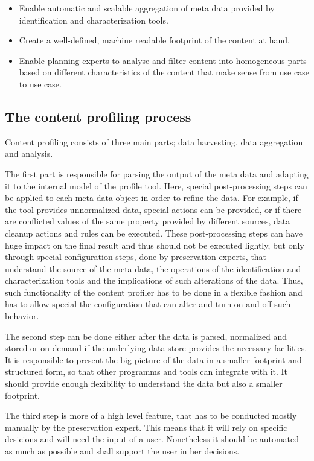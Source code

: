 \begin{itemize}
\item Enable automatic and scalable aggregation of meta data provided by identification and characterization tools.
\item Create a well-defined, machine readable footprint of the content at hand.
\item Enable planning experts to analyse and filter content into homogeneous parts based on different characteristics of the content that make sense from use case to use case.
\end{itemize}
\subsection{The content profiling process}
Content profiling consists of three main parts; data harvesting, data aggregation and analysis.

The first part is responsible for parsing the output of the meta data and adapting it to the internal model of the profile tool. Here, special post-processing steps can be applied to each meta data object in order to refine the data. For example, if the tool provides unnormalized data, special actions can be provided, or if there are conflicted values of the same property provided by different sources, data cleanup actions and rules can be executed. These post-processing steps can have huge impact on the final result and thus should not be executed lightly, but only through special configuration steps, done by preservation experts, that understand the source of the meta data, the operations of the identification and characterization tools and the implications of such alterations of the data. Thus, such functionality of the content profiler has to be done in a flexible fashion and has to allow special the configuration that can alter and turn on and off such behavior.

The second step can be done either after the data is parsed, normalized and stored or on demand if the underlying data store provides the necessary facilities. It is responsible to present the big picture of the data in a smaller footprint and structured form, so that other programms and tools can integrate with it. It should provide enough flexibility to understand the data but also a smaller footprint.

The third step is more of a high level feature, that has to be conducted mostly manually by the preservation expert. This means that it will rely on specific desicions and will need the input of a user. Nonetheless it should be automated as much as possible and shall support the user in her decisions.


